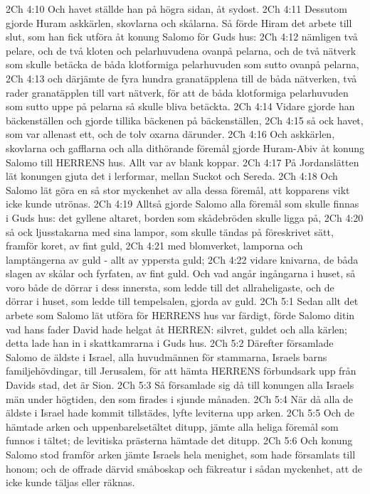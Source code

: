 2Ch 4:10  Och havet ställde han på högra sidan, åt sydost.
2Ch 4:11  Dessutom gjorde Huram askkärlen, skovlarna och skålarna. Så förde Hiram det arbete till slut, som han fick utföra åt konung Salomo för Guds hus:
2Ch 4:12  nämligen två pelare, och de två kloten och pelarhuvudena ovanpå pelarna, och de två nätverk som skulle betäcka de båda klotformiga pelarhuvuden som sutto ovanpå pelarna,
2Ch 4:13  och därjämte de fyra hundra granatäpplena till de båda nätverken, två rader granatäpplen till vart nätverk, för att de båda klotformiga pelarhuvuden som sutto uppe på pelarna så skulle bliva betäckta.
2Ch 4:14  Vidare gjorde han bäckenställen och gjorde tillika bäckenen på bäckenställen,
2Ch 4:15  så ock havet, som var allenast ett, och de tolv oxarna därunder.
2Ch 4:16  Och askkärlen, skovlarna och gafflarna och alla dithörande föremål gjorde Huram-Abiv åt konung Salomo till HERRENS hus. Allt var av blank koppar.
2Ch 4:17  På Jordanslätten lät konungen gjuta det i lerformar, mellan Suckot och Sereda.
2Ch 4:18  Och Salomo lät göra en så stor myckenhet av alla dessa föremål, att kopparens vikt icke kunde utrönas.
2Ch 4:19  Alltså gjorde Salomo alla föremål som skulle finnas i Guds hus: det gyllene altaret, borden som skådebröden skulle ligga på,
2Ch 4:20  så ock ljusstakarna med sina lampor, som skulle tändas på föreskrivet sätt, framför koret, av fint guld,
2Ch 4:21  med blomverket, lamporna och lamptängerna av guld - allt av yppersta guld;
2Ch 4:22  vidare knivarna, de båda slagen av skålar och fyrfaten, av fint guld. Och vad angår ingångarna i huset, så voro både de dörrar i dess innersta, som ledde till det allraheligaste, och de dörrar i huset, som ledde till tempelsalen, gjorda av guld.
2Ch 5:1  Sedan allt det arbete som Salomo lät utföra för HERRENS hus var färdigt, förde Salomo ditin vad hans fader David hade helgat åt HERREN: silvret, guldet och alla kärlen; detta lade han in i skattkamrarna i Guds hus.
2Ch 5:2  Därefter församlade Salomo de äldste i Israel, alla huvudmännen för stammarna, Israels barns familjehövdingar, till Jerusalem, för att hämta HERRENS förbundsark upp från Davids stad, det är Sion.
2Ch 5:3  Så församlade sig då till konungen alla Israels män under högtiden, den som firades i sjunde månaden.
2Ch 5:4  När då alla de äldste i Israel hade kommit tillstädes, lyfte leviterna upp arken.
2Ch 5:5  Och de hämtade arken och uppenbarelsetältet ditupp, jämte alla heliga föremål som funnos i tältet; de levitiska prästerna hämtade det ditupp.
2Ch 5:6  Och konung Salomo stod framför arken jämte Israels hela menighet, som hade församlats till honom; och de offrade därvid småboskap och fäkreatur i sådan myckenhet, att de icke kunde täljas eller räknas.
